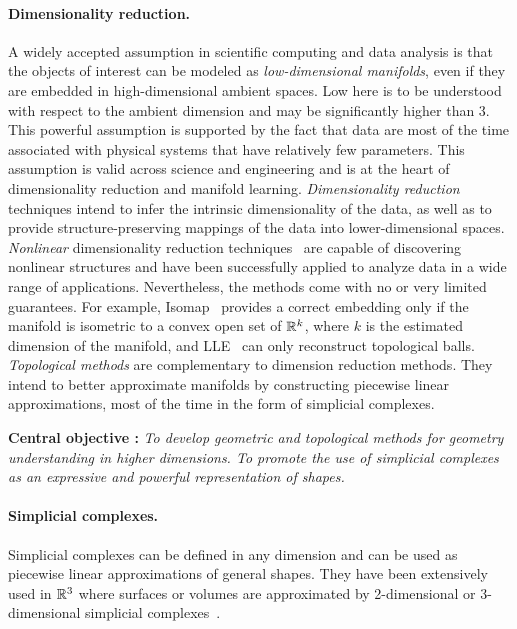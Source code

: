\paragraph{Dimensionality reduction.} A widely accepted assumption in scientific computing and data analysis is that the objects of interest can be modeled as {\em low-dimensional manifolds}, even if they are embedded in high-dimensional ambient spaces. Low here is to be understood with respect to the ambient dimension and may be significantly higher than 3. This powerful assumption is supported by the fact that data are most of the time associated with physical systems that have relatively few parameters.  This assumption is valid across science and engineering and is at the heart of dimensionality reduction and manifold learning.
{\em Dimensionality reduction} techniques intend to infer the intrinsic dimensionality of the data, as well as to provide structure-preserving mappings of the data into lower-dimensional spaces. {\em Nonlinear} dimensionality reduction techniques~\cite{lv-nldr-2007} are capable of discovering {nonlinear} structures and have been successfully applied to analyze data in a wide range of applications.
Nevertheless, the methods come with no or very limited guarantees. For example, Isomap~\cite{tsl-isomap-2000} provides a correct embedding only if the manifold is isometric to a convex open set of $\mathbb R ^k$, where $k$ is the estimated dimension of the manifold, and LLE~\cite{rs-lle-2000} can only reconstruct topological balls. {\em Topological methods} are complementary to dimension reduction methods. They intend to better approximate manifolds by constructing piecewise linear approximations, most of the time  in the form of simplicial complexes.

\vspace{2mm}  

{\bf Central objective :} {\em To develop geometric and topological methods for geometry understanding in higher dimensions.  To promote the use  of simplicial complexes as an expressive and powerful representation of shapes. }

\paragraph{Simplicial complexes.}  Simplicial complexes can be defined in any dimension and can be used as piecewise linear approximations of general shapes.
They have been extensively used in $\mathbb R ^3$ where surfaces or volumes are approximated by 2-dimensional or 3-dimensional simplicial complexes~\cite{geometrica-ecg-book}. 

